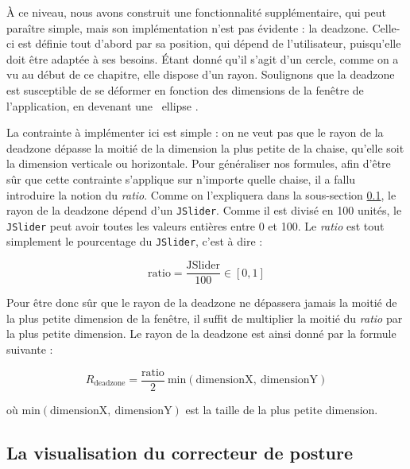 \documentclass{polytech/polytech}
\begin{document}
À ce niveau, nous avons construit une fonctionnalité supplémentaire, qui peut paraître simple, mais son implémentation n'est pas évidente : la deadzone. Celle-ci est définie tout d'abord par sa position, qui dépend de l'utilisateur, puisqu'elle doit être adaptée à ses besoins. Étant donné qu’il s’agit d’un cercle, comme on a vu au début de ce chapitre, elle dispose d’un rayon. Soulignons que la deadzone est susceptible de se déformer en fonction des dimensions de la fenêtre de l'application, en devenant une \guillemotleft\ ellipse \guillemotright .

La contrainte à implémenter ici est simple : on ne veut pas que le rayon de la deadzone dépasse la moitié de la dimension la plus petite de la chaise, qu'elle soit la dimension verticale ou horizontale. Pour généraliser nos formules, afin d'être sûr que cette contrainte s'applique sur n’importe quelle chaise, il a fallu introduire la notion du \textit{ratio}. Comme on l'expliquera dans la sous-section \ref{subsec:visualisation}, le rayon de la deadzone dépend d'un \texttt{JSlider}. Comme il est divisé en 100 unités, le \texttt{JSlider} peut avoir toutes les valeurs entières entre 0 et 100. Le \textit{ratio} est tout simplement le pourcentage du \texttt{JSlider}, c'est à dire :

$$\mathrm{ratio} = \frac{\mathrm{JSlider}}{100} \in [0, 1]$$

Pour être donc sûr que le rayon de la deadzone ne dépassera jamais la moitié de la plus petite dimension de la fenêtre, il suffit de multiplier la moitié du \textit{ratio} par la plus petite dimension. Le rayon de la deadzone est ainsi donné par la formule suivante :

$$R_\mathrm{deadzone} = \frac{\mathrm{ratio}}{2}\ \mathrm{min}(\mathrm{dimensionX},\ \mathrm{dimensionY})$$

où $\mathrm{min}(\mathrm{dimensionX},\ \mathrm{dimensionY})$ est la taille de la plus petite dimension.

\subsection{La visualisation du correcteur de posture}
\label{subsec:visualisation}
\end{document}
